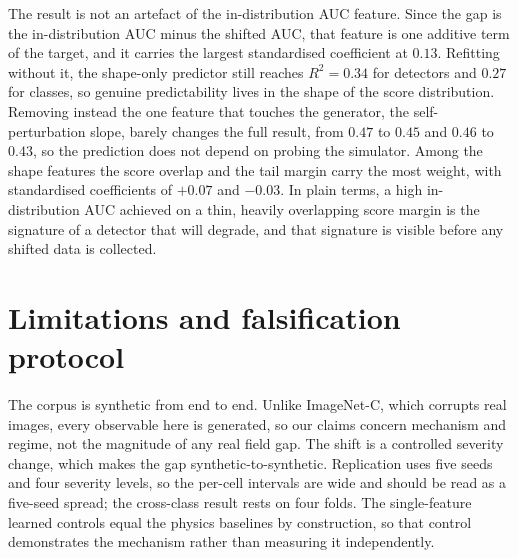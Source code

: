 \documentclass[conference]{IEEEtran}
\begin{document}
The result is not an artefact of the in-distribution AUC feature. Since the gap is
the in-distribution AUC minus the shifted AUC, that feature is one additive term of
the target, and it carries the largest standardised coefficient at $0.13$. Refitting
without it, the shape-only predictor still reaches $R^2 = 0.34$ for detectors and
$0.27$ for classes, so genuine predictability lives in the shape of the score
distribution. Removing instead the one feature that touches the generator, the
self-perturbation slope, barely changes the full result, from $0.47$ to $0.45$ and
$0.46$ to $0.43$, so the prediction does not depend on probing the simulator. Among
the shape features the score overlap and the tail margin carry the most weight, with
standardised coefficients of $+0.07$ and $-0.03$. In plain terms, a high
in-distribution AUC achieved on a thin, heavily overlapping score margin is the
signature of a detector that will degrade, and that signature is visible before any
shifted data is collected.

\section{Limitations and falsification protocol}\label{sec:limits}
The corpus is synthetic from end to end. Unlike ImageNet-C, which corrupts real
images, every observable here is generated, so our claims concern mechanism and
regime, not the magnitude of any real field gap. The shift is a controlled severity
change, which makes the gap synthetic-to-synthetic. Replication uses five seeds and
four severity levels, so the per-cell intervals are wide and should be read as a
five-seed spread; the cross-class result rests on four folds. The single-feature
learned controls equal the physics baselines by construction, so that control
demonstrates the mechanism rather than measuring it independently.
\end{document}
